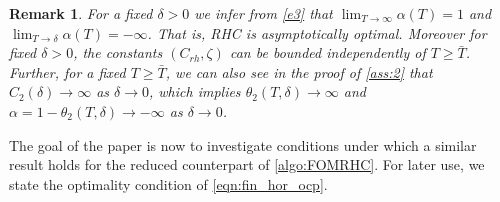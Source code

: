 \documentclass{m2an}
\newtheorem{remark}[thrm]{Remark}
\begin{document}
%
\begin{remark}
    For a fixed $\delta > 0$ we infer from \eqref{e3} that $\lim_{T \to \infty} \alpha(T) = 1$ and $\lim_{T \to \delta} \alpha(T) = -\infty$. That is, RHC is \emph{asymptotically optimal}. Moreover for fixed $\delta>0$, the constants $(C_{rh},\zeta)$ can be bounded independently of $T \geq \bar T$. Further, for a fixed $T \geq \bar T$, we can also see in the proof of \cref{ass:2} that $C_2(\delta)\to \infty$ as $\delta \to 0$, which implies $\theta_2(T,\delta)\to \infty$ and $\alpha = 1-\theta_2(T,\delta)\to -\infty$ as $\delta \to 0$.
\end{remark}
%
The goal of the paper is now to investigate conditions under which a similar result holds for the reduced counterpart of \cref{algo:FOMRHC}. 
%
For later use, we state the optimality condition of \eqref{eqn:fin_hor_ocp}.
%
\end{document}
